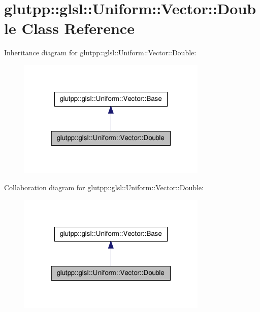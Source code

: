 \hypertarget{classglutpp_1_1glsl_1_1Uniform_1_1Vector_1_1Double}{\section{glutpp\-:\-:glsl\-:\-:\-Uniform\-:\-:\-Vector\-:\-:\-Double \-Class \-Reference}
\label{classglutpp_1_1glsl_1_1Uniform_1_1Vector_1_1Double}
}


\-Inheritance diagram for glutpp\-:\-:glsl\-:\-:\-Uniform\-:\-:\-Vector\-:\-:\-Double\-:\nopagebreak
\begin{figure}[H]
\begin{center}
\leavevmode
\includegraphics[width=256pt]{classglutpp_1_1glsl_1_1Uniform_1_1Vector_1_1Double__inherit__graph}
\end{center}
\end{figure}


\-Collaboration diagram for glutpp\-:\-:glsl\-:\-:\-Uniform\-:\-:\-Vector\-:\-:\-Double\-:\nopagebreak
\begin{figure}[H]
\begin{center}
\leavevmode
\includegraphics[width=256pt]{classglutpp_1_1glsl_1_1Uniform_1_1Vector_1_1Double__coll__graph}
\end{center}
\end{figure}
